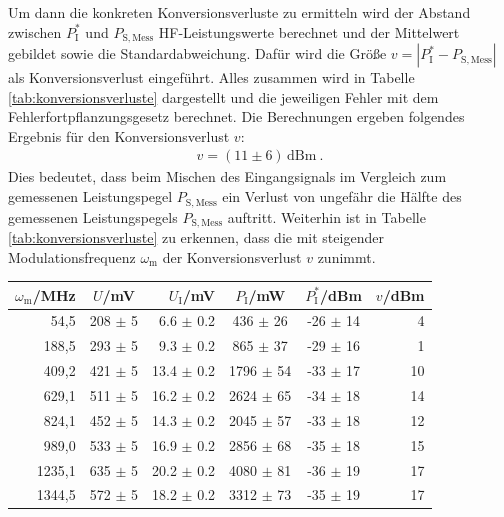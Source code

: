 Um dann die konkreten Konversionsverluste zu ermitteln wird der Abstand zwischen $P^*_\mathrm{I}$ und $P_\mathrm{S,Mess}$ HF-Leistungswerte berechnet und der Mittelwert gebildet sowie die Standardabweichung. Dafür wird die Größe $v = |P^*_\mathrm{I} - P_\mathrm{S,Mess}|$ als Konversionsverlust eingeführt. Alles zusammen wird in Tabelle \ref{tab:konversionsverluste} dargestellt und die jeweiligen Fehler mit dem Fehlerfortpflanzungsgesetz berechnet. Die Berechnungen ergeben folgendes Ergebnis für den Konversionsverlust $v$:
\begin{gather}
    \boxed{v = (11 \pm 6)\,\mathrm{dBm}}~.
\end{gather}
Dies bedeutet, dass beim Mischen des Eingangsignals im Vergleich zum gemessenen Leistungspegel $P_\mathrm{S,Mess}$ ein Verlust von ungefähr die Hälfte des gemessenen Leistungspegels $P_\mathrm{S,Mess}$ auftritt. Weiterhin ist in Tabelle \ref{tab:konversionsverluste} zu erkennen, dass die mit steigender Modulationsfrequenz $\omega_\mathrm{m}$ der Konversionsverlust $v$ zunimmt.

\begin{center}
    \captionsetup{type=table}
    \begin{tabular}{r | c r | c c | r }
        $\omega_\mathrm{m}$/MHz & $U$/mV & $U_\mathrm{I}$/mV & $P_\mathrm{I}$/mW & $P^*_\mathrm{I}$/dBm & $v$/dBm\\ \hline
        54,5   & 208 $\pm$ 5 & 6.6  $\pm$ 0.2 &  436 $\pm$ 26 & -26 $\pm$ 14 &  4\\
        188,5  & 293 $\pm$ 5 & 9.3  $\pm$ 0.2 &  865 $\pm$ 37 & -29 $\pm$ 16 &  1\\
        409,2  & 421 $\pm$ 5 & 13.4 $\pm$ 0.2 & 1796 $\pm$ 54 & -33 $\pm$ 17 & 10\\
        629,1  & 511 $\pm$ 5 & 16.2 $\pm$ 0.2 & 2624 $\pm$ 65 & -34 $\pm$ 18 & 14\\
        824,1  & 452 $\pm$ 5 & 14.3 $\pm$ 0.2 & 2045 $\pm$ 57 & -33 $\pm$ 18 & 12\\
        989,0  & 533 $\pm$ 5 & 16.9 $\pm$ 0.2 & 2856 $\pm$ 68 & -35 $\pm$ 18 & 15\\
        1235,1 & 635 $\pm$ 5 & 20.2 $\pm$ 0.2 & 4080 $\pm$ 81 & -36 $\pm$ 19 & 17\\
        1344,5 & 572 $\pm$ 5 & 18.2 $\pm$ 0.2 & 3312 $\pm$ 73 & -35 $\pm$ 19 & 17\\
    \end{tabular}
    \label{tab:konversionsverluste}
\end{center}

